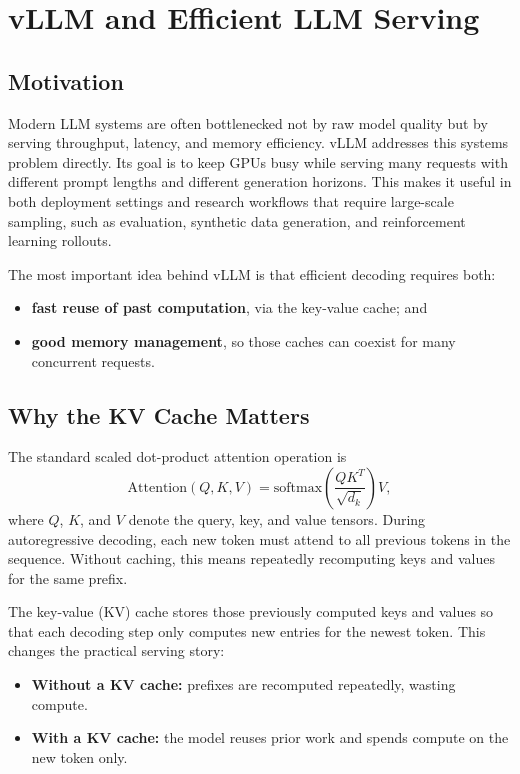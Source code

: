 \documentclass[class=article,crop=false]{standalone}
\begin{document}
\section{vLLM and Efficient LLM Serving}
\label{sec:vllm}

\subsection{Motivation}
\label{sec:vllm:motivation}

Modern LLM systems are often bottlenecked not by raw model quality but by serving throughput, latency, and memory efficiency. vLLM addresses this systems problem directly. Its goal is to keep GPUs busy while serving many requests with different prompt lengths and different generation horizons. This makes it useful in both deployment settings and research workflows that require large-scale sampling, such as evaluation, synthetic data generation, and reinforcement learning rollouts.

The most important idea behind vLLM is that efficient decoding requires both:
\begin{itemize}
  \item \textbf{fast reuse of past computation}, via the key-value cache; and
  \item \textbf{good memory management}, so those caches can coexist for many concurrent requests.
\end{itemize}

\subsection{Why the KV Cache Matters}
\label{sec:vllm:kv}

The standard scaled dot-product attention operation is
\[
\text{Attention}(Q, K, V) = \text{softmax}\left(\frac{QK^T}{\sqrt{d_k}}\right)V,
\]
where $Q$, $K$, and $V$ denote the query, key, and value tensors. During autoregressive decoding, each new token must attend to all previous tokens in the sequence. Without caching, this means repeatedly recomputing keys and values for the same prefix.

The key-value (KV) cache stores those previously computed keys and values so that each decoding step only computes new entries for the newest token. This changes the practical serving story:
\begin{itemize}
  \item \textbf{Without a KV cache:} prefixes are recomputed repeatedly, wasting compute.
  \item \textbf{With a KV cache:} the model reuses prior work and spends compute on the new token only.
\end{itemize}
\end{document}
